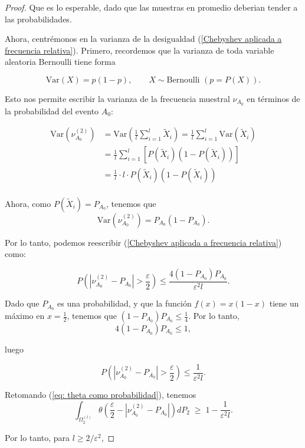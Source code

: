 \documentclass{report}
\begin{document}
\begin{proof}
Que es lo esperable, dado que las muestras en promedio deberian tender a las probabilidades.\newline

Ahora, centrémonos en la varianza de la desigualdad (\ref{Chebyshev aplicada a frecuencia relativa}). Primero,
recordemos que la varianza de toda variable aleatoria Bernoulli tiene forma

\[
     \text{Var}(X) = p(1-p), \qquad X \sim \text{Bernoulli } (p=P(X)).
\]
\bigskip

Esto nos permite escribir la varianza de la frecuencia muestral $\nu_{A_0}$ en términos de la probabilidad del evento $A_0$:

\[
\begin{aligned}
    \text{Var}\left(\nu_{A_0}^{(2)}\right) &=\text{Var}\left(\frac{1}{l}\sum_{i=1}^l \tilde{X}_i\right)
    = \frac{1}{l}\sum_{i=1}^l \text{Var}\left(\tilde{X}_i\right)\\
    &= \frac{1}{l}\sum_{i=1}^l \left[P(\tilde{X}_i)(1-P(\tilde{X}_i))\right]\\
    &=\frac{1}{l} \cdot l\cdot P(\tilde{X}_i)(1-P(\tilde{X}_i)) \\
\end{aligned}
\]

Ahora, como $P(\tilde{X}_i) = P_{A_0}$, tenemos que 
\[
    \text{Var}\left(\nu_{A_0}^{(2)}\right) = P_{A_0}(1-P_{A_0}).
\]

Por lo tanto, podemos reescribir (\ref{Chebyshev aplicada a frecuencia relativa}) como:

\[
P\left( \left| \nu^{(2)}_{A_0} - P_{A_0} \right| > \frac{\varepsilon}{2} \right) 
\leq \frac{4(1 - P_{A_0}) P_{A_0}}{\varepsilon^2 l}.
\]\newline

Dado que $P_{A_0}$ es una probabilidad, y que la función $f(x)=x(1-x)$ tiene un máximo en $x=\frac{1}{2}$, tenemos que
$(1 - P_{A_0}) P_{A_0} \leq \frac{1}{4}$. Por lo tanto,
\[4(1 - P_{A_0}) P_{A_0} \leq 1, 
\]

luego

\[
P\left( \left| \nu^{(2)}_{A_0} - P_{A_0} \right| > \frac{\varepsilon}{2} \right) \leq \frac{1}{\varepsilon^2 l}.
\]\newline

Retomando (\ref{eq: theta como probabilidad}), tenemos 
\[
    \int_{ \Omega_2^{(l)}}  \theta\left(\frac{\varepsilon}{2} - |\nu^{(2)}_{A_0}-P_{A_0}|\right) dP_2 \;\geq\; 1 - \frac{1}{\varepsilon^2 l}.
    \]

Por lo tanto, para \( l \geq 2 / \varepsilon^2 \),


\end{proof}
\end{document}

